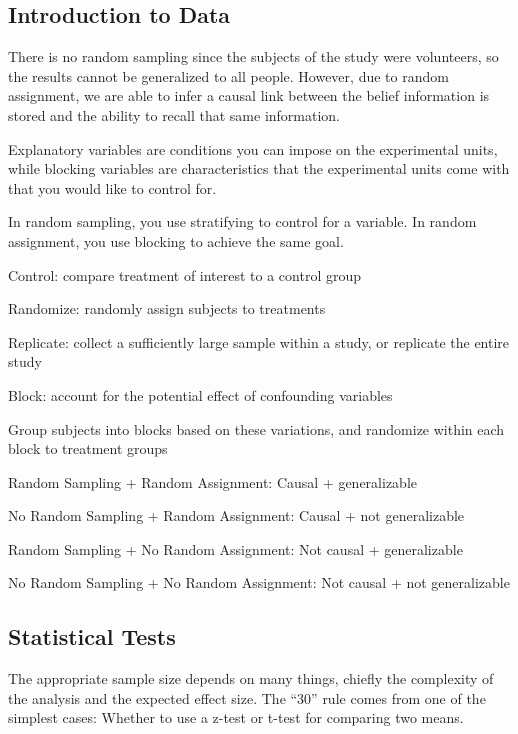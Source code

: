 \documentclass[]{book}
\begin{document}
\subsection*{Introduction to Data}\label{introduction-to-data}

There is no random sampling since the subjects of the study were
volunteers, so the results cannot be generalized to all people. However,
due to random assignment, we are able to infer a causal link between the
belief information is stored and the ability to recall that same
information.

Explanatory variables are conditions you can impose on the experimental
units, while blocking variables are characteristics that the
experimental units come with that you would like to control for.

In random sampling, you use stratifying to control for a variable. In
random assignment, you use blocking to achieve the same goal.

Control: compare treatment of interest to a control group

Randomize: randomly assign subjects to treatments

Replicate: collect a sufficiently large sample within a study, or
replicate the entire study

Block: account for the potential effect of confounding variables

Group subjects into blocks based on these variations, and randomize
within each block to treatment groups

Random Sampling + Random Assignment: Causal + generalizable

No Random Sampling + Random Assignment: Causal + not generalizable

Random Sampling + No Random Assignment: Not causal + generalizable

No Random Sampling + No Random Assignment: Not causal + not
generalizable

\subsection{Statistical Tests}\label{statistical-tests}

The appropriate sample size depends on many things, chiefly the
complexity of the analysis and the expected effect size. The ``30'' rule
comes from one of the simplest cases: Whether to use a z-test or t-test
for comparing two means.
\end{document}
